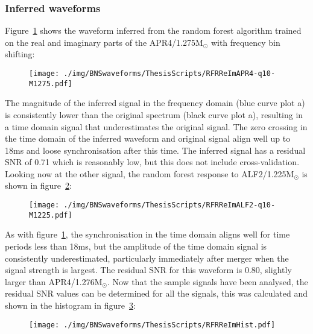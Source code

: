 \subsubsection{Inferred waveforms}
Figure~\ref{fig:RFRReImAPR4-q10-M1275} shows the waveform inferred from the random forest algorithm trained on the real and imaginary parts of the APR4/1.275M$_\odot$ with frequency bin shifting:
\begin{figure}[H]
	\texttt{[image: ./img/BNSwaveforms/ThesisScripts/RFRReImAPR4-q10-M1275.pdf]} 
	\caption[\protect]{\protect}
	\label{fig:RFRReImAPR4-q10-M1275}
\end{figure}
The magnitude of the inferred signal in the frequency domain (blue curve plot a) is consistently lower than the original spectrum (black curve plot a), resulting in a time domain signal that underestimates the original signal. The zero crossing in the time domain of the inferred waveform and original signal align well up to 18ms and loose synchronisation after this time. The inferred signal has a residual SNR of 0.71 which is reasonably low, but this does not include cross-validation. Looking now at the other signal, the random forest response to ALF2/1.225M$_\odot$ is shown in figure~\ref{fig:RFRReImALF2-q10-M1225}:
\begin{figure}[H]
	\texttt{[image: ./img/BNSwaveforms/ThesisScripts/RFRReImALF2-q10-M1225.pdf]} 
	\caption[\protect]{\protect}
	\label{fig:RFRReImALF2-q10-M1225}
\end{figure}
As with figure~\ref{fig:RFRReImAPR4-q10-M1275}, the synchronisation in the time domain aligns well for time periods less than 18ms, but the amplitude of the time domain signal is consistently underestimated, particularly immediately after merger when the signal strength is largest. The residual SNR for this waveform is 0.80, slightly larger than APR4/1.276M$_\odot$. Now that the sample signals have been analysed, the residual SNR values can be determined for all the signals, this was calculated and shown in the  histogram in figure~\ref{fig:RFRReImHist}:
\begin{figure}[H]
	\centering
	\texttt{[image: ./img/BNSwaveforms/ThesisScripts/RFRReImHist.pdf]} 
	\caption[\protect]{\protect}
	\label{fig:RFRReImHist}
\end{figure}
